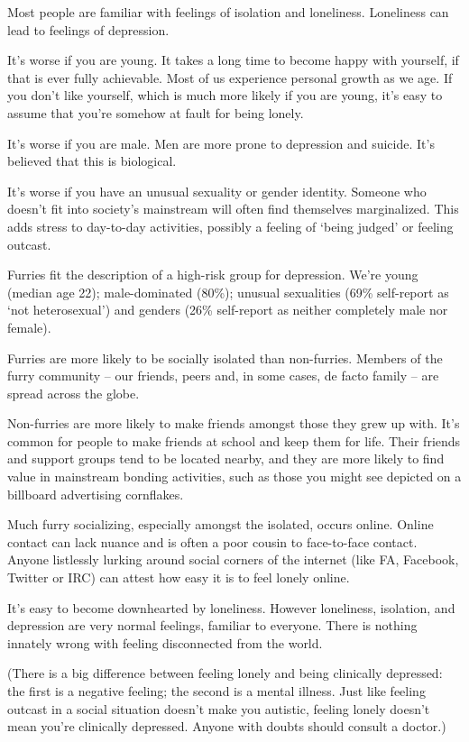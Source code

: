 Most people are familiar with feelings of isolation and loneliness. Loneliness can lead to feelings of depression.

It's worse if you are young. It takes a long time to become happy with yourself, if that is ever fully achievable. Most of us experience personal growth as we age. If you don't like yourself, which is much more likely if you are young, it's easy to assume that you're somehow at fault for being lonely.

It's worse if you are male. Men are more prone to depression and suicide. It's believed that this is biological.

It's worse if you have an unusual sexuality or gender identity. Someone who doesn't fit into society's mainstream will often find themselves marginalized. This adds stress to day-to-day activities, possibly a feeling of ‘being judged' or feeling outcast.

Furries fit the description of a high-risk group for depression. We're young (median age 22); male-dominated (80\%); unusual sexualities (69\% self-report as ‘not heterosexual') and genders (26\% self-report as neither completely male nor female).

Furries are more likely to be socially isolated than non-furries. Members of the furry community -- our friends, peers and, in some cases, de facto family -- are spread across the globe.

Non-furries are more likely to make friends amongst those they grew up with. It's common for people to make friends at school and keep them for life. Their friends and support groups tend to be located nearby, and they are more likely to find value in mainstream bonding activities, such as those you might see depicted on a billboard advertising cornflakes.

Much furry socializing, especially amongst the isolated, occurs online. Online contact can lack nuance and is often a poor cousin to face-to-face contact. Anyone listlessly lurking around social corners of the internet (like FA, Facebook, Twitter or IRC) can attest how easy it is to feel lonely online.

It's easy to become downhearted by loneliness. However loneliness, isolation, and depression are very normal feelings, familiar to everyone. There is nothing innately wrong with feeling disconnected from the world.

(There is a big difference between feeling lonely and being clinically depressed: the first is a negative feeling; the second is a mental illness. Just like feeling outcast in a social situation doesn't make you autistic, feeling lonely doesn't mean you're clinically depressed. Anyone with doubts should consult a doctor.)

